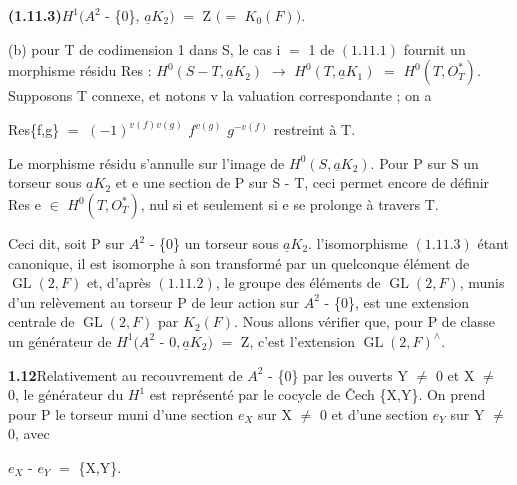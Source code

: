 \documentclass[10pt,a4paper]{article}
\begin{document}
\clearpage
{}
\label{d035-physical-012}
\par\noindent\textbf{(1.11.3)}\quad $H^1(A^2$ - \{0\}, $\underline{a}K_2)$ $=$ Z $(=$ $K_0(F))$.\par
\par (b) pour T de codimension 1 dans S, le cas i $=$ 1 de $(1.11.1)$ fournit un morphisme résidu Res : $H^0(S-T,\underline{a}K_2)$ $\to{}$ $H^0(T,\underline{a}K_1)$ $=$ $H^0(T,O_T^*)$. Supposons T connexe, et notons v la valuation correspondante ; on a\par
\par\smallskip\begin{center}\begin{minipage}{0.96\textwidth}\centering
Res\{f,g\} $=$ $(-1)^{v(f)v(g)}$ $f^{v(g)}$ $g^{-v(f)}$ restreint à T.
\end{minipage}\end{center}\smallskip
\par Le morphisme résidu s'annulle sur l'image de $H^0(S,\underline{a}K_2)$. Pour P sur S un torseur sous $\underline{a}K_2$ et e une section de P sur S - T, ceci permet encore de définir Res e $\in{}$ $H^0(T,O_T^*)$, nul si et seulement si e se prolonge à travers T.\par
\par Ceci dit, soit P sur $A^2$ - \{0\} un torseur sous $\underline{a}K_2$. l'isomorphisme $(1.11.3)$ étant canonique, il est isomorphe à son transformé par un quelconque élément de $\operatorname{GL}(2,F)$ et, d'après $(1.11.2)$, le groupe des éléments de $\operatorname{GL}(2,F)$, munis d'un relèvement au torseur P de leur action sur $A^2$ - \{0\}, est une extension centrale de $\operatorname{GL}(2,F)$ par $K_2(F)$. Nous allons vérifier que, pour P de classe un générateur de $H^1(A^2$ - ${0},\underline{a}K_2)$ $=$ Z, c'est l'extension $\operatorname{GL}(2,F)^\wedge{}$.\par
\par\noindent\textbf{1.12}\quad Relativement au recouvrement de $A^2$ - \{0\} par les ouverts Y $\ne{}$ 0 et X $\ne{}$ 0, le générateur du $H^1$ est représenté par le cocycle de Čech \{X,Y\}. On prend pour P le torseur muni d'une section $e_X$ sur X $\ne{}$ 0 et d'une section $e_Y$ sur Y $\ne{}$ 0, avec\par
\par\smallskip\begin{center}\begin{minipage}{0.96\textwidth}\centering
$e_X$ - $e_Y$ $=$ \{X,Y\}.
\end{minipage}\end{center}\smallskip
\end{document}
